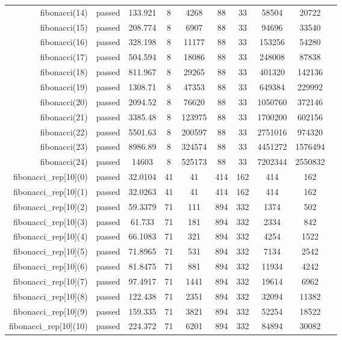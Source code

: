 \begin{longtable}{r|ccccccccc}
    fibonacci(14) & passed & 133.921 & 8 & 4268 & 88 & 33 & 58504 & 20722 \\
    fibonacci(15) & passed & 208.774 & 8 & 6907 & 88 & 33 & 94696 & 33540 \\
    fibonacci(16) & passed & 328.198 & 8 & 11177 & 88 & 33 & 153256 & 54280 \\
    fibonacci(17) & passed & 504.594 & 8 & 18086 & 88 & 33 & 248008 & 87838 \\
    fibonacci(18) & passed & 811.967 & 8 & 29265 & 88 & 33 & 401320 & 142136 \\
    fibonacci(19) & passed & 1308.71 & 8 & 47353 & 88 & 33 & 649384 & 229992 \\
    fibonacci(20) & passed & 2094.52 & 8 & 76620 & 88 & 33 & 1050760 & 372146 \\
    fibonacci(21) & passed & 3385.48 & 8 & 123975 & 88 & 33 & 1700200 & 602156 \\
    fibonacci(22) & passed & 5501.63 & 8 & 200597 & 88 & 33 & 2751016 & 974320 \\
    fibonacci(23) & passed & 8986.89 & 8 & 324574 & 88 & 33 & 4451272 & 1576494 \\
    fibonacci(24) & passed & 14603 & 8 & 525173 & 88 & 33 & 7202344 & 2550832 \\
    fibonacci\_rep[10](0) & passed & 32.0104 & 41 & 41 & 414 & 162 & 414 & 162 \\
    fibonacci\_rep[10](1) & passed & 32.0263 & 41 & 41 & 414 & 162 & 414 & 162 \\
    fibonacci\_rep[10](2) & passed & 59.3379 & 71 & 111 & 894 & 332 & 1374 & 502 \\
    fibonacci\_rep[10](3) & passed & 61.733 & 71 & 181 & 894 & 332 & 2334 & 842 \\
    fibonacci\_rep[10](4) & passed & 66.1083 & 71 & 321 & 894 & 332 & 4254 & 1522 \\
    fibonacci\_rep[10](5) & passed & 71.8965 & 71 & 531 & 894 & 332 & 7134 & 2542 \\
    fibonacci\_rep[10](6) & passed & 81.8475 & 71 & 881 & 894 & 332 & 11934 & 4242 \\
    fibonacci\_rep[10](7) & passed & 97.4917 & 71 & 1441 & 894 & 332 & 19614 & 6962 \\
    fibonacci\_rep[10](8) & passed & 122.438 & 71 & 2351 & 894 & 332 & 32094 & 11382 \\
    fibonacci\_rep[10](9) & passed & 159.335 & 71 & 3821 & 894 & 332 & 52254 & 18522 \\
    fibonacci\_rep[10](10) & passed & 224.372 & 71 & 6201 & 894 & 332 & 84894 & 30082 \\

\end{longtable}
